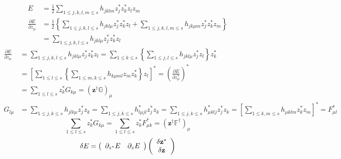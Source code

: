 \documentclass[aps,preprint]{revtex4}%
\begin{document}
\begin{align}
E  & =\frac{1}{2}\sum_{1\leq j,k,l,m\leq s}h_{jklm}z_{j}^{\ast}z_{k}^{\ast
}z_{l}z_{m}\\
\frac{\partial E}{\partial z_{\mu}}  & =\frac{1}{2}\left\{  \sum_{1\leq
j,k,l\leq s}h_{jkl\mu}z_{j}^{\ast}z_{k}^{\ast}z_{l}+\sum_{1\leq j,k,l,m\leq
s}h_{jk\mu m}z_{j}^{\ast}z_{k}^{\ast}z_{m}\right\}  \\
& =\sum_{1\leq j,k,l\leq s}h_{jkl\mu}z_{j}^{\ast}z_{k}^{\ast}z_{l}%
\end{align}%
\begin{align}
\frac{\partial E}{\partial z_{\mu}}  & =\sum_{1\leq j,k,l\leq s}h_{jkl\mu
}z_{j}^{\ast}z_{k}^{\ast}z_{l}=\sum_{1\leq k\leq s}\left\{  \sum_{1\leq
j,l\leq s}h_{jkl\mu}z_{j}^{\ast}z_{l}\right\}  z_{k}^{\ast}\\
& =\left[  \sum_{1\leq l\leq s}\left\{  \sum_{1\leq m,k\leq s}h_{k\mu ml}%
z_{m}z_{k}^{\ast}\right\}  z_{l}\right]  ^{\ast}=\left(  \frac{\partial
E}{\partial z_{\mu}^{\ast}}\right)  ^{\ast}\\
& =\sum_{1\leq l\leq s}z_{k}^{\ast}G_{k\mu}=\left(  \mathbf{z}^{\dagger
}\mathbb{G}\right)  _{\mu}\\
G_{l\mu}  & =\sum_{1\leq j,k\leq s}h_{jlk\mu}z_{j}^{\ast}z_{k}=\sum_{1\leq
j,k\leq s}h_{l\mu jl}^{\ast}z_{j}^{\ast}z_{k}=\sum_{1\leq j,k\leq s}h_{\mu
klj}^{\ast}z_{j}^{\ast}z_{k}=\left[  \sum_{1\leq k,m\leq s}h_{\mu klm}%
z_{k}^{\ast}z_{m}\right]  ^{\ast}=F_{\mu l}^{\ast}%
\end{align}%
\begin{equation}
\sum_{1\leq l\leq s}z_{k}^{\ast}G_{k\mu}=\sum_{1\leq l\leq s}z_{k}^{\ast
}F_{\mu k}^{\ast}=\left(  \mathbf{z}^{\dagger}\mathbb{F}^{\dagger}\right)
_{\mu}%
\end{equation}%
\begin{equation}
\delta E=\left(
\begin{array}
[c]{cc}%
\partial_{z^{\ast}}E & \partial_{z}E
\end{array}
\right)  \left(
\begin{array}
[c]{c}%
\delta\mathbf{z}^{\ast}\\
\delta\mathbf{z}%
\end{array}
\right)
\end{equation}
%
\end{document}
